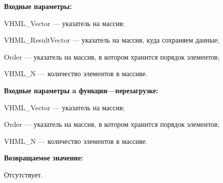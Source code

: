 \textbf{Входные параметры:}
 
VHML\_Vector --- указатель на массив;
 
VHML\_ResultVector --- указатель на массив, куда сохраняем данные;
 
Order --- указатель на массив, в котором хранится порядок элементов;
 
VHML\_N --- количество элементов в массиве.
 
\textbf{Входные параметры a функции---перезагрузке:}
 
VHML\_Vector --- указатель на массив;
 
Order --- указатель на массив, в котором хранится порядок элементов;
 
VHML\_N --- количество элементов в массиве.

\textbf{Возвращаемое значение:}

Отсутствует.